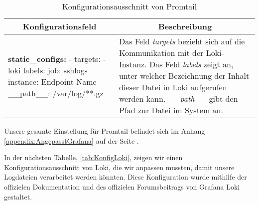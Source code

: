 \begin{table}[H]
  \begin{tabularx}{\textwidth}{|m{5.5cm}|X|}
  \hline
  \multicolumn{1}{|c|}{\textbf{Konfigurationsfeld}} & \multicolumn{1}{|c|}{\textbf{Beschreibung}} \\
  \hline
  \textbf{static\_configs:} \newline
  - targets: \newline
  \hphantom{te}- loki \newline
  \hphantom{te}labels: \newline
  \hphantom{text}job: sshlogs \newline
  \hphantom{text}instance: \gls{Endpoint}-Name \newline
  \hphantom{text}\_\_path\_\_: /var/log/**.gz & Das Feld \textit{targets} bezieht sich auf die Kommunikation mit der Loki-Instanz. Das Feld \textit{labels} zeigt an, unter welcher Bezeichnung der Inhalt dieser Datei in Loki aufgerufen werden kann. \textit{\_\_path\_\_} gibt den Pfad zur Datei im System an.\\
  \hline
  \end{tabularx}
  \caption[Konfigurationsausschnitt von Promtail]
  {Konfigurationsausschnitt von Promtail}
  \label{tab:KonfigPromtail}
\end{table}

Unsere gesamte Einstellung für Promtail befindet sich im Anhang \ref{appendix:AngepasstGrafana} auf der Seite \pageref{appendix:AngepasstGrafana}.

In der nächsten Tabelle, \ref{tab:KonfigLoki}, zeigen wir einen Konfigurationsausschnitt von Loki, die wir anpassen mussten, damit unsere Logdateien verarbeitet werden könnten. Diese Konfiguration wurde mithilfe der offizielen Dokumentation \citep{Grafana_ConfigLoki} und des offizielen Forumsbeitrags von Grafana Loki \citep{githubforum} gestaltet.

